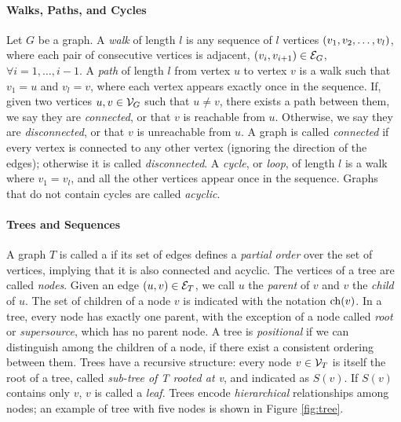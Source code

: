 \paragraph{Walks, Paths, and Cycles}
Let $G$ be a graph. A \emph{walk} of length $l$ is any sequence of $l$ vertices $\left( v_1, v_2, \ldots, v_l \right)$, where each pair of consecutive vertices is adjacent, \ie $\Seq{v_i, v_{i+1}} \in \Cal{E}_G$, $\forall i= 1, \ldots, i-1$. A \emph{path} of length $l$ from vertex $u$ to vertex $v$ is a walk such that $v_1 = u$ and $v_l = v$, where each vertex appears exactly once in the sequence. If, given two vertices $u, v \in \Cal{V}_G$ such that $u \neq v$, there exists a path between them, we say they are \emph{connected}, or that $v$ is reachable from $u$. Otherwise, we say they are \emph{disconnected}, or that $v$ is unreachable from $u$. A graph is called \emph{connected} if every vertex is connected to any other vertex (ignoring the direction of the edges); otherwise it is called \emph{disconnected}. A \emph{cycle}, or \emph{loop}, of length $l$ is a walk where $v_1 = v_l$, and all the other vertices appear once in the sequence. Graphs that do not contain cycles are called \emph{acyclic}.

\paragraph{Trees and Sequences}
A graph $T$ is called a  if its set of edges defines a \emph{partial order} over the set of vertices, implying that it is also connected and acyclic. The vertices of a tree are called \emph{nodes}. Given an edge $(u, v) \in \Cal{E}_T$, we call $u$ the \emph{parent} of $v$ and $v$ the \emph{child} of $u$. The set of children of a node $v$ is indicated with the notation $\mathrm{ch}(v)$. In a tree, every node has exactly one parent, with the exception of a node called \emph{root} or \emph{supersource}, which has no parent node. A tree is \emph{positional} if we can distinguish among the children of a node, \ie if there exist a consistent ordering between them. Trees have a recursive structure: every node $v \in \Cal{V}_T$ is itself the root of a tree, called \emph{sub-tree of T rooted at v}, and indicated as $S(v)$. If $S(v)$ contains only $v$, $v$ is called a \emph{leaf}. Trees encode \emph{hierarchical} relationships among nodes; an example of tree with five nodes is shown in Figure \ref{fig:tree}.

